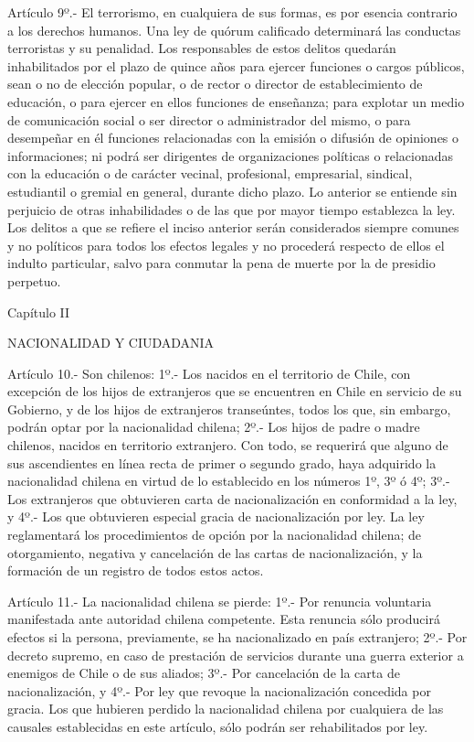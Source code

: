     Artículo 9º.- El terrorismo, en cualquiera de sus formas, es por esencia contrario a los derechos humanos.
    Una ley de quórum calificado determinará las conductas terroristas y su penalidad. Los responsables de estos delitos quedarán inhabilitados por el plazo de quince años para ejercer funciones o cargos públicos, sean o no de elección popular, o de rector o director de establecimiento de educación, o para ejercer en ellos funciones de enseñanza; para explotar un medio de comunicación social o ser director o administrador del mismo, o para desempeñar en él funciones relacionadas con la emisión o difusión de opiniones o informaciones; ni podrá ser dirigentes de organizaciones políticas o relacionadas con la educación o de carácter vecinal, profesional, empresarial, sindical, estudiantil o gremial en general, durante dicho plazo. Lo anterior se entiende sin perjuicio de otras inhabilidades o de las que por mayor tiempo establezca la ley.
    Los delitos a que se refiere el inciso anterior serán considerados siempre comunes y no políticos para todos los efectos legales y no procederá respecto de ellos el indulto particular, salvo para conmutar la pena de muerte por la de presidio perpetuo.


    Capítulo II

    NACIONALIDAD Y CIUDADANIA



    Artículo 10.- Son chilenos:
    1º.- Los nacidos en el territorio de Chile, con excepción de los hijos de extranjeros que se encuentren en Chile en servicio de su Gobierno, y de los hijos de extranjeros transeúntes, todos los que, sin embargo, podrán optar por la nacionalidad chilena;
    2º.- Los hijos de padre o madre chilenos, nacidos en territorio extranjero. Con todo, se requerirá que alguno de sus ascendientes en línea recta de primer o segundo grado, haya adquirido la nacionalidad chilena en virtud de lo establecido en los números 1º, 3º ó 4º;
    3º.- Los extranjeros que obtuvieren carta de nacionalización en conformidad a la ley, y
    4º.- Los que obtuvieren especial gracia de nacionalización por ley.
    La ley reglamentará los procedimientos de opción por la nacionalidad chilena; de otorgamiento, negativa y cancelación de las cartas de nacionalización, y la formación de un registro de todos estos actos.


    Artículo 11.- La nacionalidad chilena se pierde:
    1º.- Por renuncia voluntaria manifestada ante autoridad chilena competente. Esta renuncia sólo producirá efectos si la persona, previamente, se ha nacionalizado en país extranjero;
    2º.- Por decreto supremo, en caso de prestación de servicios durante una guerra exterior a enemigos de Chile o de sus aliados;
    3º.- Por cancelación de la carta de nacionalización, y
    4º.- Por ley que revoque la nacionalización concedida por gracia.
    Los que hubieren perdido la nacionalidad chilena por cualquiera de las causales establecidas en este artículo, sólo podrán ser rehabilitados por ley.


